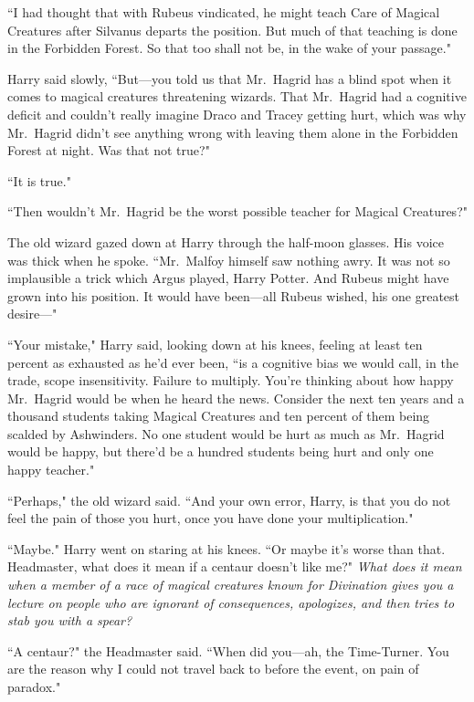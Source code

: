 ``I had thought that with Rubeus vindicated, he might teach Care of Magical Creatures after Silvanus departs the position. But much of that teaching is done in the Forbidden Forest. So that too shall not be, in the wake of your passage."

Harry said slowly, ``But---you told us that Mr.~Hagrid has a blind spot when it comes to magical creatures threatening wizards. That Mr.~Hagrid had a cognitive deficit and couldn't really imagine Draco and Tracey getting hurt, which was why Mr.~Hagrid didn't see anything wrong with leaving them alone in the Forbidden Forest at night. Was that not true?"

``It is true."

``Then wouldn't Mr.~Hagrid be the worst possible teacher for Magical Creatures?"

The old wizard gazed down at Harry through the half-moon glasses. His voice was thick when he spoke. ``Mr.~Malfoy himself saw nothing awry. It was not so implausible a trick which Argus played, Harry Potter. And Rubeus might have grown into his position. It would have been---all Rubeus wished, his one greatest desire---"

``Your mistake," Harry said, looking down at his knees, feeling at least ten percent as exhausted as he'd ever been, ``is a cognitive bias we would call, in the trade, scope insensitivity. Failure to multiply. You're thinking about how happy Mr.~Hagrid would be when he heard the news. Consider the next ten years and a thousand students taking Magical Creatures and ten percent of them being scalded by Ashwinders. No one student would be hurt as much as Mr.~Hagrid would be happy, but there'd be a hundred students being hurt and only one happy teacher."

``Perhaps," the old wizard said. ``And your own error, Harry, is that you do not feel the pain of those you hurt, once you have done your multiplication."

``Maybe." Harry went on staring at his knees. ``Or maybe it's worse than that. Headmaster, what does it mean if a centaur doesn't like me?" \emph{What does it mean when a member of a race of magical creatures known for Divination gives you a lecture on people who are ignorant of consequences, apologizes, and then tries to stab you with a spear?}

``A centaur?" the Headmaster said. ``When did you---ah, the Time-Turner. You are the reason why I could not travel back to before the event, on pain of paradox."

